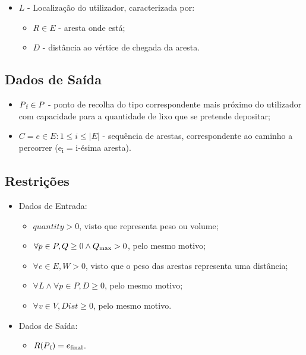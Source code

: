 \documentclass[article, a4paper, 12pt, oneside]{memoir}
\begin{document}
\begin{itemize}
\begin{itemize}
	\end{itemize} %

\item $L$ - Localização do utilizador, caracterizada por:
	
	\begin{itemize}
	
	\item $R \in E$ - aresta onde está;
	\item $D$ - distância ao vértice de chegada da aresta.
	
	\end{itemize}

\end{itemize} %

\subsection{Dados de Saída}

\begin{itemize}
\item $P\textsubscript{f} \in P$ - ponto de recolha do tipo correspondente mais próximo do utilizador com capacidade para a quantidade de lixo que se pretende depositar;
\item $C = {e \in E: 1 \leq i \leq |E|}$ - sequência de arestas, correspondente ao caminho a percorrer (e\textsubscript{i} = i-ésima aresta).
\end{itemize}


\subsection{Restrições}

\begin{itemize}

\item Dados de Entrada:

	\begin{itemize}
	\item $quantity > 0$, visto que representa peso ou volume;
	\item $\forall  p \in P, Q \geq 0 \land Q\textsubscript{max} > 0$, pelo mesmo motivo;
	\item $\forall  e \in E, W > 0$, visto que o peso das arestas representa uma distância;
	\item $\forall L \land \forall p \in P, D \geq 0$, pelo mesmo motivo;
	\item $\forall v \in V, Dist \geq 0$, pelo mesmo motivo.
	\end{itemize}
	
\item Dados de Saída:

	\begin{itemize}
	\item $R(P\textsubscript{f}) = e\textsubscript{final}$.
	\end{itemize}
	
\end{itemize}
\end{document}
